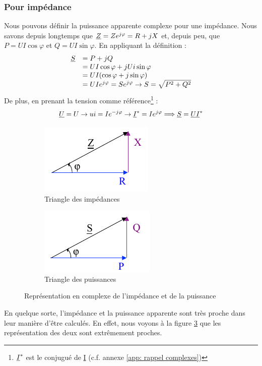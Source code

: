 \documentclass[12pt,a4paper]{article}
\newcommand{\uz}{\uline{Z} }
\newcommand{\ui}{\uline{I} }
\newcommand{\uu}{\uline{U} }
\newcommand{\us}{\uline{S} }
\begin{document}
\subsubsection{Pour impédance}
Nous pouvons définir la puissance apparente complexe pour une impédance. Nous savons depuis longtemps que $\uz = Ze^{j\varphi} = R + jX$ et, depuis peu, que $P = UI \cos\varphi$ et $Q = UI \sin\varphi$. En appliquant la définition :
\begin{equation}
	\begin{array}{rl}
	\us &= P + jQ\\
	&= UI \cos\varphi + jUi\sin\varphi\\
	&=UI(\cos\varphi + j\sin\varphi)\\
	&=UIe^{j\varphi} = Se^{j\varphi} \to S = \sqrt{P^2 + Q^2}
	\end{array}
\end{equation}
De plus, en prenant la tension comme référence\footnote{$\ui^*$ est le conjugué de \ui (c.f. annexe \ref{app: rappel complexes})} :
\begin{equation}
	\uu = U \to ui = Ie^{-j\varphi} \to \ui^* = Ie^{j\varphi} \Longrightarrow \us = \uu \ui^*
\end{equation}

\begin{figure}
	\centering
	\begin{subfigure}[b]{0.45\textwidth}
		\centering
		\includegraphics[scale=0.7]{images/triangle_impedance}
		\caption{Triangle des impédances}
		\label{subfig: triangle impedance}
	\end{subfigure}
	\begin{subfigure}[b]{0.45\textwidth}
		\centering
		\includegraphics[scale=0.7]{images/triangle_puissance}
		\caption{Triangle des puissances}
		\label{subfig: triangle puissance}
	\end{subfigure}
	\caption{Représentation en complexe de l'impédance et de la puissance}
	\label{figs: triangle impedance puissance}
\end{figure}
En quelque sorte, l'impédance et la puissance apparente sont très proche dans leur manière d'être calculés. En effet, nous voyons à la figure \ref{figs: triangle impedance puissance} que les représentation des deux sont extrêmement proches.
\end{document}
